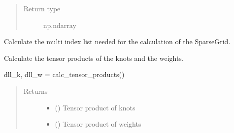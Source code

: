 \documentclass[letterpaper,10pt,english,openany,oneside]{sphinxmanual}
\begin{document}
\begin{fulllineitems}
\begin{fulllineitems}
\begin{quote}
\begin{description}
\item[{Return type}] \leavevmode
np.ndarray

\end{description}\end{quote}

\end{fulllineitems}


\begin{fulllineitems}
\label{\detokenize{pygpc:pygpc.Grid.SparseGrid.calc_multi_indices}}
Calculate the multi index list needed for the calculation of the SparseGrid.

\end{fulllineitems}


\begin{fulllineitems}
\label{\detokenize{pygpc:pygpc.Grid.SparseGrid.calc_tensor_products}}
Calculate the tensor products of the knots and the weights.

dll\_k, dll\_w = calc\_tensor\_products()
\begin{quote}\begin{description}
\item[{Returns}] \leavevmode
\begin{itemize}
\item {} 
 () \textendash{} Tensor product of knots

\item {} 
 () \textendash{} Tensor product of weights

\end{itemize}


\end{description}\end{quote}

\end{fulllineitems}


\end{fulllineitems}

\end{document}
